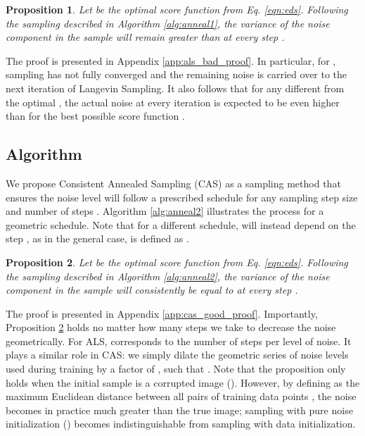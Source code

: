 \documentclass{article} \usepackage{iclr2021_conference_notitle,times}
\theoremstyle{definition}
\theoremstyle{definition}
\newtheorem{proposition}{Proposition}
\begin{document}
\begin{proposition}\label{prop:1}
\em 
Let  be the optimal score function from Eq. \ref{eqn:eds}. Following the sampling described in Algorithm \ref{alg:anneal1}, the variance of the noise component in the sample  will remain greater than  at every step . \em 
\end{proposition}


The proof is presented in Appendix \ref{app:als_bad_proof}.
In particular, for , sampling has not fully converged and the remaining noise is carried over to the next iteration of Langevin Sampling. It also follows that for any  different from the optimal , the actual noise at every iteration is expected to be even higher than for the best possible score function . 

\subsection{Algorithm}

We propose Consistent Annealed Sampling (CAS) as a sampling method that ensures the noise level will follow a prescribed schedule for any sampling step size  and number of steps . Algorithm \ref{alg:anneal2} illustrates the process for a geometric schedule. Note that for a different schedule,  will instead depend on the step , as in the general case,  is defined as .

\begin{proposition}\label{proof:2}
\em Let  be the optimal score function from Eq. \ref{eqn:eds}. Following the sampling described in Algorithm \ref{alg:anneal2}, the variance of the noise component in the sample  will consistently be equal to  at every step . \em 
\end{proposition}




The proof is presented in Appendix \ref{app:cas_good_proof}. Importantly, Proposition \ref{proof:2} holds no matter how many steps  we take to decrease the noise geometrically. For ALS,  corresponds to the number of steps per level of noise. It plays a similar role in CAS: we simply dilate the geometric series of noise levels used during training by a factor of , such that . 
Note that the proposition only holds when the initial sample is a corrupted image (). However, by defining  as the maximum Euclidean distance between all pairs of training data points \citep{song2020improved},
the noise becomes in practice much greater than the true image; sampling with pure noise initialization () becomes indistinguishable from sampling with data initialization.
\end{document}
